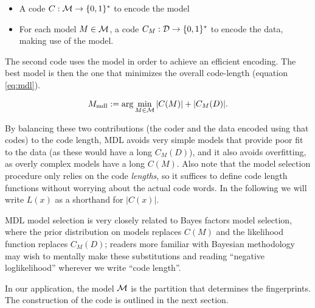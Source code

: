 \begin{itemize}
\item A code $C:{\mathcal M}\to\{0,1\}^*$ to encode the model
\item For each model $M\in{\mathcal M}$, a code $C_M:{\mathcal D}\to\{0,1\}^*$ to encode
  the data, making use of the model.
\end{itemize}

The second code uses the model in order to achieve an efficient encoding.
The best model is then the one that minimizes the overall code-length
 (equation \ref{eq:mdl}).

\begin{equation}
  \label{eq:mdl}
  M_\textnormal{mdl}:=\arg\min_{M\in{\mathcal M}}|C(M)| + |C_M(D)|.
\end{equation}

By balancing these two contributions
 (the coder and the data encoded using that codes)
 to the code length,
 MDL avoids very simple models that provide poor fit to the data
 (as these would have a long $C_M(D)$),
 and it also avoids overfitting,
 as overly complex models have a long $C(M)$.
Also note that the model selection procedure only relies on
 the code \emph{lengths}, so it suffices to define code length functions
 without worrying about the actual code words.
In the following we will write $L(x)$ as a shorthand for $|C(x)|$.

MDL model selection is very closely related to Bayes factors model selection,
 where the prior distribution on models replaces $C(M)$
and the likelihood function replaces $C_M(D)$;
readers more familiar with Bayesian methodology may wish to
 mentally make these substitutions and reading
 ``negative loglikelihood'' wherever we write ``code length''.

In our application,
 the model ${\mathcal M}$ is the partition that determines the fingerprints.
The construction of the code is outlined in the next section.



